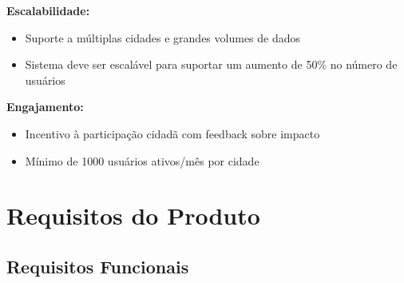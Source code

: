 \documentclass[12pt,a4paper]{article}
\begin{document}
\textbf{Escalabilidade:}
\begin{itemize}
    \item Suporte a múltiplas cidades e grandes volumes de dados
    \item Sistema deve ser escalável para suportar um aumento de 50\% no número de usuários
\end{itemize}

\textbf{Engajamento:}
\begin{itemize}
    \item Incentivo à participação cidadã com feedback sobre impacto
    \item Mínimo de 1000 usuários ativos/mês por cidade
\end{itemize}

\section{Requisitos do Produto}
\label{sec:requisitos}

\subsection{Requisitos Funcionais}
\end{document}
